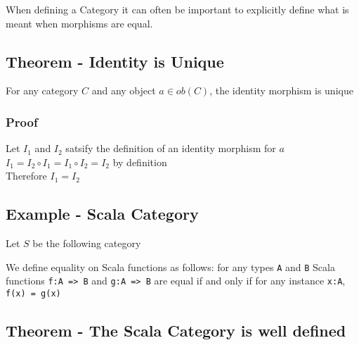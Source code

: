 \documentclass[9pt]{article} %
\begin{document}
When defining a Category it can often be important to explicitly define what is meant when morphisms are equal.

\subsection{Theorem - Identity is Unique}

For any category $C$ and any object $a \in ob(C)$, the identity morphism is unique

\subsubsection{Proof}

Let $I_1$ and $I_2$ satsify the definition of an identity morphism for $a$\newline
\\
\noindent $I_1 = I_2 \circ I_1 = I_1 \circ I_2 = I_2$ by definition
\\
\noindent Therefore $I_1 = I_2$ \blacksquare

\subsection{Example - Scala Category}

Let $S$ be the following category


We define equality on Scala functions as follows: for any types \texttt{A} and \texttt{B} Scala functions \texttt{f:A => B} and \texttt{g:A => B} are equal if and only if for any instance \texttt{x:A}, \texttt{f(x) = g(x)}

\subsection{Theorem - The Scala Category is well defined}
\end{document}
